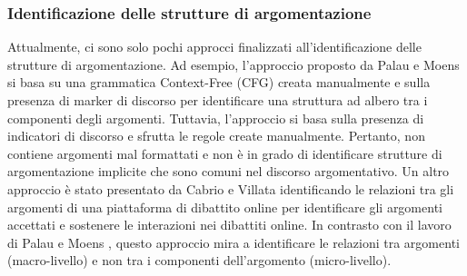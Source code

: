 \subsubsection{Identificazione delle strutture di argomentazione}
Attualmente, ci sono solo pochi approcci finalizzati all'identificazione delle strutture di argomentazione. Ad esempio, l'approccio proposto da Palau e Moens \cite{palau2009argumentation} si basa su una grammatica Context-Free (CFG) creata manualmente e sulla presenza di marker di discorso per identificare una struttura ad albero tra i componenti degli argomenti. Tuttavia, l'approccio si basa sulla presenza di indicatori di discorso e sfrutta le regole create manualmente. Pertanto, non contiene argomenti mal formattati e non è in grado di identificare strutture di argomentazione implicite che sono comuni nel discorso argomentativo. Un altro approccio è stato presentato da Cabrio e Villata \cite{cabrio2012combining} identificando le relazioni tra gli argomenti di una piattaforma di dibattito online per identificare gli argomenti accettati e sostenere le interazioni nei dibattiti online. In contrasto con il lavoro di Palau e Moens \cite{palau2009argumentation}, questo approccio mira a identificare le relazioni tra argomenti (macro-livello) e non tra i componenti dell'argomento (micro-livello).
